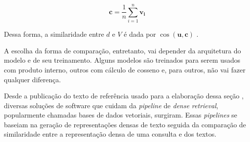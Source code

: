 \documentclass[
	12pt,				%
	openright,			%
	oneside,			%
	a4paper,			%
	english,			%
	french,				%
	spanish,			%
	brazil				%
	]{abntex2}
\begin{document}
\begin{equation}
\mathbf{c} = \frac{1}{n} \sum_{i=1}^{n} \mathbf{v_i}
\label{eq:centroid}
\end{equation}

Dessa forma, a similaridade entre $d$ e $V$ é dada por $\cos⁡ (\mathbf{u},\mathbf{c})$ .

A escolha da forma de comparação, entretanto, vai depender da arquitetura do modelo e de seu treinamento. Alguns modelos são treinados para serem usados com produto interno, outros com cálculo de cosseno e, para outros, não vai fazer qualquer diferença.

Desde a publicação do texto de referência usado para a elaboração dessa seção \cite{biblia}, diversas soluções de software que cuidam da \textit{pipeline} de \textit{dense retrieval}, popularmente chamadas bases de dados vetoriais, surgiram.
Essas \textit{pipelines} se baseiam na geração de representações densas de texto seguida da comparação de similaridade entre a representação densa de uma consulta e dos textos.









\end{document}
